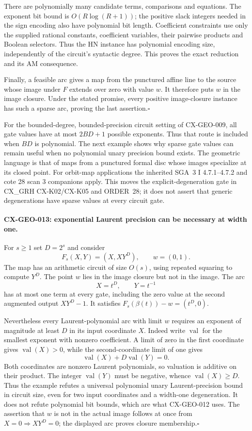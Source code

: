 \documentclass[11pt,a4paper]{article}
\begin{document}
There are polynomially many candidate terms, comparisons and equations.
The exponent bit bound is $O(R\log(R+1))$; the positive slack integers
needed in the sign encoding also have polynomial bit length. Coefficient
constraints use only the supplied rational constants, coefficient
variables, their pairwise products and Boolean selectors. Thus the HN
instance has polynomial encoding size, independently of the circuit's
syntactic degree. This proves the exact reduction and its AM consequence.

Finally, a feasible arc gives a map from the punctured affine line to
the source whose image under $F$ extends over zero with value $w$.
It therefore puts $w$ in the image closure. Under the stated promise,
every positive image-closure instance has such a sparse arc, proving the
last assertion.\hfill$\square$

For the bounded-degree, bounded-precision circuit setting of CX-GEO-009,
all gate values have at most $2BD+1$ possible exponents. Thus that route
is included when $BD$ is polynomial. The next example shows why sparse
gate values can remain useful when no polynomial unary precision bound
exists. The geometric language is that of maps from a punctured formal
disc whose images specialize at its closed point. For orbit-map
applications the inherited SGA~3 I 4.7.1--4.7.2 and cote 28 scan 3
companions apply. This moves the explicit-degeneration gate in
CX\_GRH CX-K02/CX-K05 and ORDER~28; it does not assert that generic
degenerations have sparse values at every circuit gate.

\paragraph{CX-GEO-013: exponential Laurent precision can be necessary at width one.}
For $s\ge1$ set $D=2^s$ and consider
\[
       F_s(X,Y)=(X,XY^D),\qquad w=(0,1).
\]
The map has an arithmetic circuit of size $O(s)$, using repeated
squaring to compute $Y^D$. The point $w$ lies in the image closure but
not in the image. The arc
\[
                         X=t^D,\qquad Y=t^{-1}
\]
has at most one term at every gate, including the zero value at the
second augmented output $XY^D-1$. It satisfies
$F_s(\beta(t))-w=(t^D,0)$.

Nevertheless every Laurent-polynomial arc with limit $w$ requires
an exponent of magnitude at least $D$ in its input coordinate $X$.
Indeed write $\operatorname{val}$ for the smallest exponent with
nonzero coefficient. A limit of zero in the first coordinate gives
$\operatorname{val}(X)>0$, while the second-coordinate limit of one
gives
\[
                \operatorname{val}(X)+D\operatorname{val}(Y)=0.
\]
Both coordinates are nonzero Laurent polynomials, so valuation is
additive on their product. The integer $\operatorname{val}(Y)$ must be
negative, whence $\operatorname{val}(X)\ge D$.
Thus the example refutes a universal polynomial unary Laurent-precision
bound in circuit size, even for two input coordinates and a width-one
degeneration. It does not refute polynomial bit bounds, which are what
CX-GEO-012 uses. The assertion that $w$ is not in the actual image
follows at once from $X=0\Rightarrow XY^D=0$; the displayed arc proves
closure membership.\hfill$\square$
\end{document}
